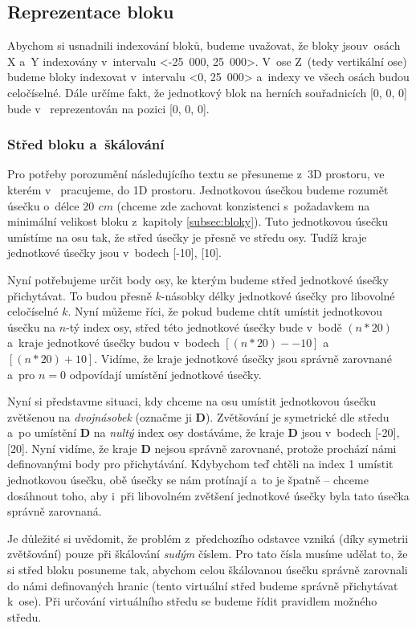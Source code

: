 \subsection{Reprezentace bloku}

Abychom si usnadnili indexování bloků, budeme uvažovat, že bloky jsou\linebreak v~osách X a~Y indexovány v~intervalu <-25~000, 25~000>. V~ose Z~(tedy vertikální ose) budeme bloky indexovat v~intervalu <0, 25~000> a~indexy ve všech osách budou celočíselné. Dále určíme fakt, že jednotkový blok na herních souřadnicích [0, 0, 0] bude v~\UEu{} reprezentován na pozici [0, 0, 0]. 

\subsubsection{Střed bloku a~škálování}
Pro potřeby porozumění následujícího textu se přesuneme z~3D prostoru, ve kterém v~\UEu{} pracujeme, do 1D prostoru. Jednotkovou úsečkou budeme rozumět úsečku o~délce $20\,\ cm$ (chceme zde zachovat konzistenci s~požadavkem na minimální velikost bloku z~kapitoly \ref{subsec:bloky}). Tuto jednotkovou úsečku umístíme na osu tak, že střed úsečky je přesně ve středu osy. Tudíž kraje jednotkové úsečky jsou v~bodech [-10], [10].

Nyní potřebujeme určit body osy, ke kterým budeme střed jednotkové úsečky přichytávat. To budou přesně $k$-násobky délky jednotkové úsečky pro libovolné celočíselné $k$. Nyní můžeme říci, že pokud budeme chtít umístit jednotkovou úsečku na $n$-tý index osy, střed této jednotkové úsečky bude v~bodě $(n * 20)$ a~kraje jednotkové úsečky budou v~bodech $[(n * 20) -- 10]$ a~$[(n * 20) + 10]$. Vidíme, že kraje jednotkové úsečky jsou správně zarovnané a~pro $n = 0$ odpovídají umístění jednotkové úsečky.

Nyní si představme situaci, kdy chceme na osu umístit jednotkovou úsečku zvětšenou na \textit{dvojnásobek} (označme ji \textbf{D}). Zvětšování je symetrické dle středu a~po umístění \textbf{D} na \textit{nultý} index osy dostáváme, že kraje \textbf{D} jsou v~bodech [-20], [20]. Nyní vidíme, že kraje \textbf{D} nejsou správně zarovnané, protože prochází námi definovanými body pro přichytávání. Kdybychom teď chtěli na index 1 umístit jednotkovou úsečku, obě úsečky se nám protínají a~to je špatně -- chceme dosáhnout toho, aby i~při libovolném zvětšení jednotkové úsečky byla tato úsečka správně zarovnaná.

Je důležité si uvědomit, že problém z~předchozího odstavce vzniká (díky symetrii zvětšování) pouze při škálování \textit{sudým} číslem. Pro tato čísla musíme udělat to, že si střed bloku   posuneme tak, abychom celou škálovanou úsečku správně zarovnali do námi definovaných hranic (tento virtuální střed budeme správně přichytávat k~ose). Při určování virtuálního středu se budeme řídit pravidlem  možného středu. 

